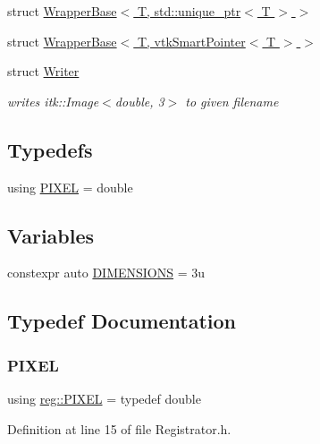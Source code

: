 \begin{DoxyCompactItemize}
\item 
struct \hyperlink{structreg_1_1_wrapper_base_3_01_t_00_01std_1_1unique__ptr_3_01_t_01_4_01_4}{Wrapper\+Base$<$ T, std\+::unique\+\_\+ptr$<$ T $>$ $>$}
\item 
struct \hyperlink{structreg_1_1_wrapper_base_3_01_t_00_01vtk_smart_pointer_3_01_t_01_4_01_4}{Wrapper\+Base$<$ T, vtk\+Smart\+Pointer$<$ T $>$ $>$}
\item 
struct \hyperlink{structreg_1_1_writer}{Writer}
\begin{DoxyCompactList}\small\item\em writes itk\+::\+Image$<$double, 3$>$ to given filename \end{DoxyCompactList}\end{DoxyCompactItemize}
\subsection*{Typedefs}
\begin{DoxyCompactItemize}
\item 
using \hyperlink{namespacereg_ae9dc228abe4f02f05191a60f2f157222}{P\+I\+X\+EL} = double
\end{DoxyCompactItemize}
\subsection*{Variables}
\begin{DoxyCompactItemize}
\item 
constexpr auto \hyperlink{namespacereg_a33163ef0ecb9428d5c82a09a19d6bf0c}{D\+I\+M\+E\+N\+S\+I\+O\+NS} = 3u
\end{DoxyCompactItemize}


\subsection{Typedef Documentation}
\mbox{\label{namespacereg_ae9dc228abe4f02f05191a60f2f157222}} 
\subsubsection{\texorpdfstring{P\+I\+X\+EL}{PIXEL}}
{\footnotesize\ttfamily using \hyperlink{namespacereg_ae9dc228abe4f02f05191a60f2f157222}{reg\+::\+P\+I\+X\+EL} = typedef double}



Definition at line 15 of file Registrator.\+h.



